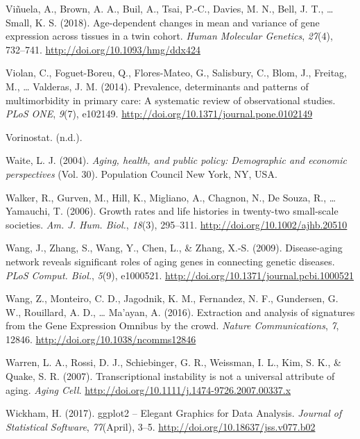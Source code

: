 \documentclass[12pt,twoside]{unicam}
\begin{document}
\begin{cslreferences}
\leavevmode\hypertarget{ref-Vinuela2018}{}%
Viñuela, A., Brown, A. A., Buil, A., Tsai, P.-C., Davies, M. N., Bell, J. T., \ldots{} Small, K. S. (2018). Age-dependent changes in mean and variance of gene expression across tissues in a twin cohort. \emph{Human Molecular Genetics}, \emph{27}(4), 732--741. \url{http://doi.org/10.1093/hmg/ddx424}

\leavevmode\hypertarget{ref-Violan2014}{}%
Violan, C., Foguet-Boreu, Q., Flores-Mateo, G., Salisbury, C., Blom, J., Freitag, M., \ldots{} Valderas, J. M. (2014). Prevalence, determinants and patterns of multimorbidity in primary care: A systematic review of observational studies. \emph{PLoS ONE}, \emph{9}(7), e102149. \url{http://doi.org/10.1371/journal.pone.0102149}

\leavevmode\hypertarget{ref-vorinostat}{}%
Vorinostat. (n.d.).

\leavevmode\hypertarget{ref-Waite2004}{}%
Waite, L. J. (2004). \emph{Aging, health, and public policy: Demographic and economic perspectives} (Vol. 30). Population Council New York, NY, USA.

\leavevmode\hypertarget{ref-Walker2006}{}%
Walker, R., Gurven, M., Hill, K., Migliano, A., Chagnon, N., De Souza, R., \ldots{} Yamauchi, T. (2006). Growth rates and life histories in twenty-two small-scale societies. \emph{Am. J. Hum. Biol.}, \emph{18}(3), 295--311. \url{http://doi.org/10.1002/ajhb.20510}

\leavevmode\hypertarget{ref-Wang2009}{}%
Wang, J., Zhang, S., Wang, Y., Chen, L., \& Zhang, X.-S. (2009). Disease-aging network reveals significant roles of aging genes in connecting genetic diseases. \emph{PLoS Comput. Biol.}, \emph{5}(9), e1000521. \url{http://doi.org/10.1371/journal.pcbi.1000521}

\leavevmode\hypertarget{ref-Wang2016}{}%
Wang, Z., Monteiro, C. D., Jagodnik, K. M., Fernandez, N. F., Gundersen, G. W., Rouillard, A. D., \ldots{} Ma'ayan, A. (2016). Extraction and analysis of signatures from the Gene Expression Omnibus by the crowd. \emph{Nature Communications}, \emph{7}, 12846. \url{http://doi.org/10.1038/ncomms12846}

\leavevmode\hypertarget{ref-Warren2007}{}%
Warren, L. A., Rossi, D. J., Schiebinger, G. R., Weissman, I. L., Kim, S. K., \& Quake, S. R. (2007). Transcriptional instability is not a universal attribute of aging. \emph{Aging Cell}. \url{http://doi.org/10.1111/j.1474-9726.2007.00337.x}

\leavevmode\hypertarget{ref-Wickham2017}{}%
Wickham, H. (2017). ggplot2 -- Elegant Graphics for Data Analysis. \emph{Journal of Statistical Software}, \emph{77}(April), 3--5. \url{http://doi.org/10.18637/jss.v077.b02}


\end{cslreferences}
\end{document}

